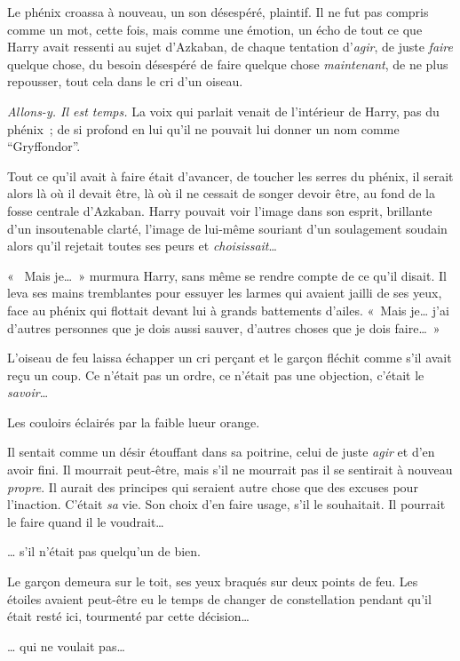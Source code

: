 Le phénix croassa à nouveau, un son désespéré, plaintif.
Il ne fut pas compris comme un mot, cette fois, mais comme une émotion, un écho de tout ce que Harry avait ressenti au sujet d'Azkaban, de chaque tentation d'\emph{agir}, de juste \emph{faire} quelque chose, du besoin désespéré de faire quelque chose \emph{maintenant}, de ne plus repousser, tout cela dans le cri d'un oiseau.

\emph{Allons-y.
Il est temps.} La voix qui parlait venait de l'intérieur de Harry, pas du phénix~; de si profond en lui qu'il ne pouvait lui donner un nom comme “Gryffondor”.

Tout ce qu'il avait à faire était d'avancer, de toucher les serres du phénix, il serait alors là où il devait être, là où il ne cessait de songer devoir être, au fond de la fosse centrale d'Azkaban.
Harry pouvait voir l'image dans son esprit, brillante d'un insoutenable clarté, l'image de lui-même souriant d'un soulagement soudain alors qu'il rejetait toutes ses peurs et \emph{choisissait}…

«~ Mais je…~»
 murmura Harry, sans même se rendre compte de ce qu'il disait.
Il leva ses mains tremblantes pour essuyer les larmes qui avaient jailli de ses yeux, face au phénix qui flottait devant lui à grands battements d'ailes.
«~Mais je… j'ai d'autres personnes que je dois aussi sauver, d'autres choses que je dois faire…~»

L'oiseau de feu laissa échapper un cri perçant et le garçon fléchit comme s'il avait reçu un coup.
Ce n'était pas un ordre, ce n'était pas une objection, c'était le \emph{savoir}…

Les couloirs éclairés par la faible lueur orange.

Il sentait comme un désir étouffant dans sa poitrine, celui de juste \emph{agir} et d'en avoir fini.
Il mourrait peut-être, mais s'il ne mourrait pas il se sentirait à nouveau \emph{propre}.
Il aurait des principes qui seraient autre chose que des excuses pour l'inaction.
C'était \emph{sa} vie.
Son choix d'en faire usage, s'il le souhaitait.
Il pourrait le faire quand il le voudrait…

… s'il n'était pas quelqu'un de bien.

\later

Le garçon demeura sur le toit, ses yeux braqués sur deux points de feu.
Les étoiles avaient peut-être eu le temps de changer de constellation pendant qu'il était resté ici, tourmenté par cette décision…

… qui ne voulait pas…


